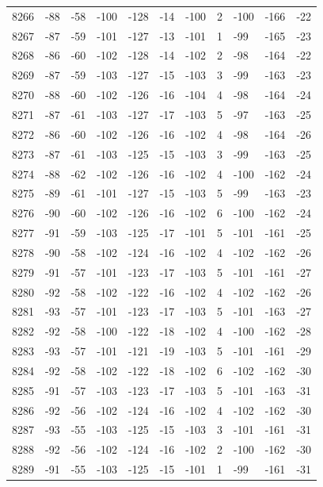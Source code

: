 \begin{table}[H]
\begin{tabular}{lllllllllll}
8266 & -88 & -58 & -100 & -128 & -14 & -100 & 2 & -100 & -166 & -22 \\
8267 & -87 & -59 & -101 & -127 & -13 & -101 & 1 & -99 & -165 & -23 \\
8268 & -86 & -60 & -102 & -128 & -14 & -102 & 2 & -98 & -164 & -22 \\
8269 & -87 & -59 & -103 & -127 & -15 & -103 & 3 & -99 & -163 & -23 \\
8270 & -88 & -60 & -102 & -126 & -16 & -104 & 4 & -98 & -164 & -24 \\
8271 & -87 & -61 & -103 & -127 & -17 & -103 & 5 & -97 & -163 & -25 \\
8272 & -86 & -60 & -102 & -126 & -16 & -102 & 4 & -98 & -164 & -26 \\
8273 & -87 & -61 & -103 & -125 & -15 & -103 & 3 & -99 & -163 & -25 \\
8274 & -88 & -62 & -102 & -126 & -16 & -102 & 4 & -100 & -162 & -24 \\
8275 & -89 & -61 & -101 & -127 & -15 & -103 & 5 & -99 & -163 & -23 \\
8276 & -90 & -60 & -102 & -126 & -16 & -102 & 6 & -100 & -162 & -24 \\
8277 & -91 & -59 & -103 & -125 & -17 & -101 & 5 & -101 & -161 & -25 \\
8278 & -90 & -58 & -102 & -124 & -16 & -102 & 4 & -102 & -162 & -26 \\
8279 & -91 & -57 & -101 & -123 & -17 & -103 & 5 & -101 & -161 & -27 \\
8280 & -92 & -58 & -102 & -122 & -16 & -102 & 4 & -102 & -162 & -26 \\
8281 & -93 & -57 & -101 & -123 & -17 & -103 & 5 & -101 & -163 & -27 \\
8282 & -92 & -58 & -100 & -122 & -18 & -102 & 4 & -100 & -162 & -28 \\
8283 & -93 & -57 & -101 & -121 & -19 & -103 & 5 & -101 & -161 & -29 \\
8284 & -92 & -58 & -102 & -122 & -18 & -102 & 6 & -102 & -162 & -30 \\
8285 & -91 & -57 & -103 & -123 & -17 & -103 & 5 & -101 & -163 & -31 \\
8286 & -92 & -56 & -102 & -124 & -16 & -102 & 4 & -102 & -162 & -30 \\
8287 & -93 & -55 & -103 & -125 & -15 & -103 & 3 & -101 & -161 & -31 \\
8288 & -92 & -56 & -102 & -124 & -16 & -102 & 2 & -100 & -162 & -30 \\
8289 & -91 & -55 & -103 & -125 & -15 & -101 & 1 & -99 & -161 & -31 \\

\end{tabular}
\end{table}
